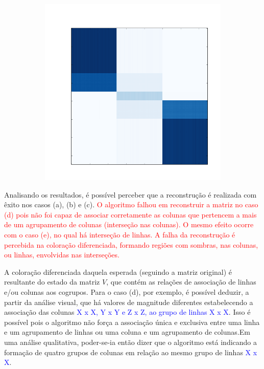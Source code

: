 \documentclass[
    12pt,                %
    oneside,            %
    a4paper,            %
    english,            %
    brazil                %
    ]{abntex2ppgsi}
\begin{document}
\begin{figure}[H]
\begin{subfigure}[b]{0.18\textwidth}
        \caption{}
    \end{subfigure}
    \begin{subfigure}[b]{0.18\textwidth}
        \includegraphics[width=\textwidth]{img/e-reconstruction-onmtf.png}
            \caption{}
    \end{subfigure}
\label{fig:reconstruction:onmtf}
\end{figure}


Analisando os resultados, é possível perceber que a reconstrução é realizada com êxito nos casos (a), (b) e (c). \textcolor{red}{O algoritmo falhou em reconstruir a matriz no caso (d) pois não foi capaz de associar corretamente as colunas que pertencem a mais de um agrupamento de colunas (interseção nas colunas). O mesmo efeito ocorre com o caso (e), no qual há interseção de linhas. A falha da reconstrução é percebida na coloração diferenciada, formando regiões com sombras, nas colunas, ou linhas, envolvidas nas interseções.}

A coloração diferenciada daquela esperada (seguindo a matriz original) é resultante do estado da matriz $V$, que contém as relações de associação de linhas e/ou colunas aos cogrupos. Para o caso (d), por exemplo, é possível deduzir, a partir da análise visual, que há valores de magnitude diferentes estabelecendo a associação das colunas \textcolor{blue}{X x X, Y x Y e Z x Z, ao grupo de linhas X x X}. Isso é possível pois o algoritmo não força a associação única e exclusiva entre uma linha e um agrupamento de linhas ou uma coluna e um agrupamento de colunas.Em uma análise qualitativa, poder-se-ia então dizer que o algoritmo está indicando a formação de quatro grupos de colunas em relação ao mesmo grupo de linhas \textcolor{blue}{X x X}.
\end{document}
